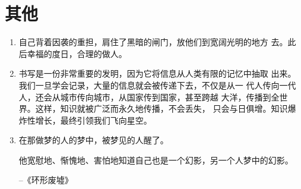 \documentclass[UTF8]{ctexart}
\begin{document}
	\section{其他}
	
		\begin{enumerate}
			
			\item 自己背着因袭的重担，肩住了黑暗的闸门，放他们到宽阔光明的地方
			去。此后幸福的度日，合理的做人。
			
			\item 书写是一份非常重要的发明，因为它将信息从人类有限的记忆中抽取
			出来。我们一旦学会记录，大量的信息就会被传递下去，不仅是从一
			代人传向一代人，还会从城市传向城市，从国家传到国家，甚至跨越
			大洋，传播到全世界。这样，知识就被广泛而永久地传播，不会丢失，
			只会与日俱增。知识爆炸性增长，最终引领我们飞向星空。
			\item 在那做梦的人的梦中，被梦见的人醒了。
			
			他宽慰地、惭愧地、害怕地知道自己也是一个幻影，另一个人梦中的幻影。
			
			\hfill --《环形废墟》
			
		\end{enumerate}
		
		
	
	
	
\end{document}
